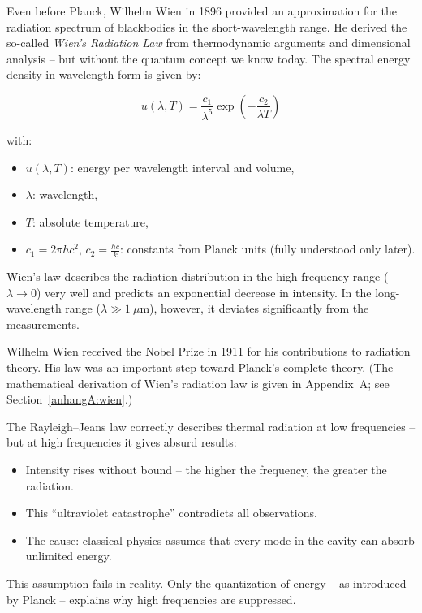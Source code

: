 Even before Planck, Wilhelm Wien in 1896 provided an approximation for the radiation spectrum of blackbodies in the short-wavelength range. He derived the so-called \emph{Wien’s Radiation Law} from thermodynamic arguments and dimensional analysis – but without the quantum concept we know today.
\newpage
\noindent
The spectral energy density in wavelength form is given by:

\[
u(\lambda, T) = \frac{c_1}{\lambda^5} \exp\left(-\frac{c_2}{\lambda T}\right)
\]

with:
\begin{itemize}
	\item \( u(\lambda, T) \): energy per wavelength interval and volume,
	\item \( \lambda \): wavelength,
	\item \( T \): absolute temperature,
	\item \( c_1 = 2\pi h c^2 \), \( c_2 = \tfrac{hc}{k} \): constants from Planck units (fully understood only later).
\end{itemize}

Wien’s law describes the radiation distribution in the high-frequency range (\( \lambda \to 0 \)) very well and predicts an exponential decrease in intensity. In the long-wavelength range (\( \lambda \gg 1\ \mu\mathrm{m} \)), however, it deviates significantly from the measurements.

Wilhelm Wien received the Nobel Prize in 1911 for his contributions to radiation theory. His law was an important step toward Planck’s complete theory.  
(The mathematical derivation of Wien’s radiation law is given in Appendix~A; see Section~\ref{anhangA:wien}.)

\vspace{1em}
\begin{tcolorbox}[didaktikbox, title=Why Does the Classical Theory Fail?]
	\label{box:klassik-versagt}
	The Rayleigh–Jeans law correctly describes thermal radiation at low frequencies – but at high frequencies it gives absurd results:
	
	\begin{itemize}
		\item Intensity rises without bound – the higher the frequency, the greater the radiation.
		\item This “ultraviolet catastrophe” contradicts all observations.
		\item The cause: classical physics assumes that every mode in the cavity can absorb unlimited energy.
	\end{itemize}
	
	This assumption fails in reality. Only the quantization of energy – as introduced by Planck – explains why high frequencies are suppressed.
\end{tcolorbox}
